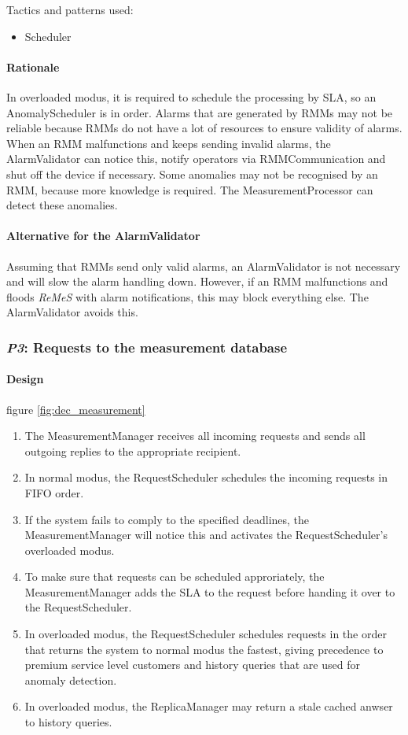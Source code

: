 \documentclass[a4paper,10pt]{article}
\newcommand{\rem}{\emph{ReMeS}\xspace}
\begin{document}
\noindent Tactics and patterns used:
\begin{itemize}
	\item Scheduler
\end{itemize}

\paragraph{Rationale} In overloaded modus, it is required to schedule the processing by SLA, so an AnomalyScheduler is in order. Alarms that are generated by RMMs may not be reliable because RMMs do not have a lot of resources to ensure validity of alarms. When an RMM malfunctions and keeps sending invalid alarms, the AlarmValidator can notice this, notify operators via RMMCommunication and shut off the device if necessary. Some anomalies may not be recognised by an RMM, because more knowledge is required. The MeasurementProcessor can detect these anomalies.

\paragraph{Alternative for the AlarmValidator}
Assuming that RMMs send only valid alarms, an AlarmValidator is not necessary and will slow the alarm handling down. However, if an RMM malfunctions and floods \rem with alarm notifications, this may block everything else. The AlarmValidator avoids this.

\subsubsection{\emph{P3}: Requests to the measurement database}

\paragraph{Design} figure \ref{fig:dec_measurement}

\begin{enumerate}
	\item The MeasurementManager receives all incoming requests and sends all outgoing replies to the appropriate recipient.
	\item In normal modus, the RequestScheduler schedules the incoming requests in FIFO order.
    \item If the system fails to comply to the specified deadlines, the MeasurementManager will notice this and activates the RequestScheduler's overloaded modus.
    \item To make sure that requests can be scheduled approriately, the MeasurementManager adds the SLA to the request before handing it over to the RequestScheduler.
    \item In overloaded modus, the RequestScheduler schedules requests in the order that returns the system to normal modus the fastest, giving precedence to premium service level customers and history queries that are used for anomaly detection.
    \item In overloaded modus, the ReplicaManager may return a stale cached anwser to history queries.
\end{enumerate}
\end{document}
